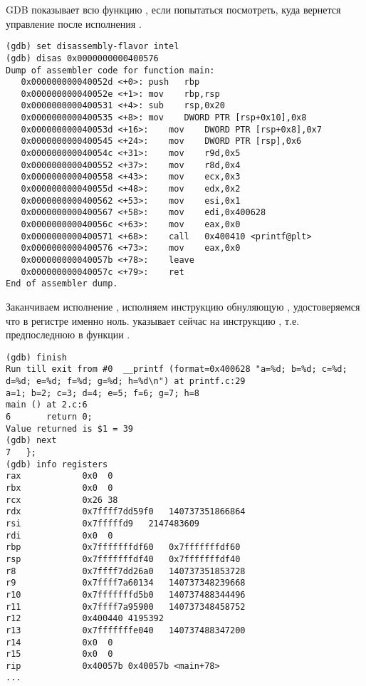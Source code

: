 \ac{GDB} показывает всю функцию \main, если попытаться посмотреть, куда вернется управление после исполнения \printf{}.

\begin{lstlisting}[style=customasmx86]
(gdb) set disassembly-flavor intel
(gdb) disas 0x0000000000400576
Dump of assembler code for function main:
   0x000000000040052d <+0>:	push   rbp
   0x000000000040052e <+1>:	mov    rbp,rsp
   0x0000000000400531 <+4>:	sub    rsp,0x20
   0x0000000000400535 <+8>:	mov    DWORD PTR [rsp+0x10],0x8
   0x000000000040053d <+16>:	mov    DWORD PTR [rsp+0x8],0x7
   0x0000000000400545 <+24>:	mov    DWORD PTR [rsp],0x6
   0x000000000040054c <+31>:	mov    r9d,0x5
   0x0000000000400552 <+37>:	mov    r8d,0x4
   0x0000000000400558 <+43>:	mov    ecx,0x3
   0x000000000040055d <+48>:	mov    edx,0x2
   0x0000000000400562 <+53>:	mov    esi,0x1
   0x0000000000400567 <+58>:	mov    edi,0x400628
   0x000000000040056c <+63>:	mov    eax,0x0
   0x0000000000400571 <+68>:	call   0x400410 <printf@plt>
   0x0000000000400576 <+73>:	mov    eax,0x0
   0x000000000040057b <+78>:	leave  
   0x000000000040057c <+79>:	ret    
End of assembler dump.
\end{lstlisting}

Заканчиваем исполнение \printf, исполняем инструкцию обнуляющую \EAX, удостоверяемся что в регистре \EAX именно ноль.
\RIP указывает сейчас на инструкцию , т.е. предпоследнюю в функции \main{}.

\begin{lstlisting}
(gdb) finish
Run till exit from #0  __printf (format=0x400628 "a=%d; b=%d; c=%d; d=%d; e=%d; f=%d; g=%d; h=%d\n") at printf.c:29
a=1; b=2; c=3; d=4; e=5; f=6; g=7; h=8
main () at 2.c:6
6		return 0;
Value returned is $1 = 39
(gdb) next
7	};
(gdb) info registers
rax            0x0	0
rbx            0x0	0
rcx            0x26	38
rdx            0x7ffff7dd59f0	140737351866864
rsi            0x7fffffd9	2147483609
rdi            0x0	0
rbp            0x7fffffffdf60	0x7fffffffdf60
rsp            0x7fffffffdf40	0x7fffffffdf40
r8             0x7ffff7dd26a0	140737351853728
r9             0x7ffff7a60134	140737348239668
r10            0x7fffffffd5b0	140737488344496
r11            0x7ffff7a95900	140737348458752
r12            0x400440	4195392
r13            0x7fffffffe040	140737488347200
r14            0x0	0
r15            0x0	0
rip            0x40057b	0x40057b <main+78>
...
\end{lstlisting}

